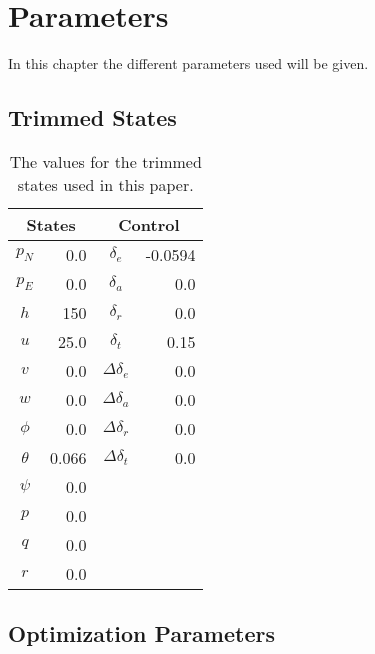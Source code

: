 \chapter{Parameters}

In this chapter the different parameters used will be given.


\section{Trimmed States}

\begin{table}[h]
\centering
\begin{tabular}{|c r | c r|}
    \hline
    \multicolumn{2}{|c|}{States} & \multicolumn{2}{|c|}{Control} \\
    \hline
    $p_N$ & 0.0      & $\delta_e$ & -0.0594 \\
    $p_E$ & 0.0      & $\delta_a$ & 0.0 \\
    $h$ & 150        & $\delta_r$ & 0.0 \\
    $u$ & 25.0       & $\delta_t$ & 0.15 \\
    $v$ & 0.0        & $\Delta \delta_e$ & 0.0 \\
    $w$ & 0.0        & $\Delta \delta_a$ & 0.0 \\
    $\phi$ & 0.0     & $\Delta \delta_r$ & 0.0 \\
    $\theta$ & 0.066 & $\Delta \delta_t$ & 0.0 \\
    $\psi$ & 0.0     & & \\
    $p$ & 0.0        & & \\
    $q$ & 0.0        & & \\
    $r$ & 0.0        & & \\
    \hline
\end{tabular}
\caption{The values for the trimmed states used in this paper.}
\label{tab:trim_states}
\end{table}

\newpage
\section{Optimization Parameters}

